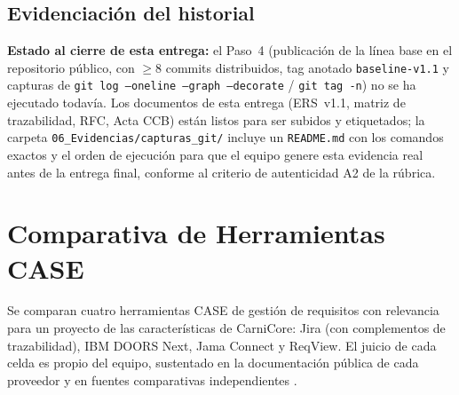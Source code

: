 \documentclass[11pt,a4paper]{article}
\begin{document}
\subsection{Evidenciación del historial}
\textbf{Estado al cierre de esta entrega:} el Paso~4 (publicación de la línea base en el repositorio público, con $\geq$8 commits distribuidos, tag anotado \texttt{baseline-v1.1} y capturas de \texttt{git log --oneline --graph --decorate} / \texttt{git tag -n}) no se ha ejecutado todavía. Los documentos de esta entrega (ERS~v1.1, matriz de trazabilidad, RFC, Acta CCB) están listos para ser subidos y etiquetados; la carpeta \texttt{06\_Evidencias/capturas\_git/} incluye un \texttt{README.md} con los comandos exactos y el orden de ejecución para que el equipo genere esta evidencia real antes de la entrega final, conforme al criterio de autenticidad A2 de la rúbrica.

\section{Comparativa de Herramientas CASE}
\label{sec:comparativa-case}
Se comparan cuatro herramientas CASE de gestión de requisitos con relevancia para un proyecto de las características de CarniCore: Jira (con complementos de trazabilidad), IBM DOORS Next, Jama Connect y ReqView. El juicio de cada celda es propio del equipo, sustentado en la documentación pública de cada proveedor y en fuentes comparativas independientes \cite{clelandhuang2012traceability,wiegers2013softwarerequirements}.
\end{document}
